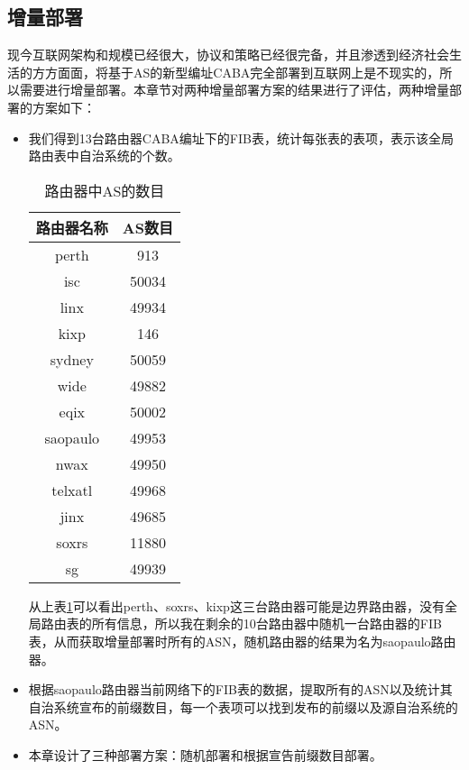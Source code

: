 \subsection{增量部署}
现今互联网架构和规模已经很大，协议和策略已经很完备，并且渗透到经济社会生活的方方面面，将基于AS的新型编址CABA完全部署到互联网上是不现实的，所以需要进行增量部署。本章节对两种增量部署方案的结果进行了评估，两种增量部署的方案如下：
\begin{itemize}
\item 我们得到13台路由器CABA编址下的FIB表，统计每张表的表项，表示该全局路由表中自治系统的个数。

    \begin{table}[h]
    \centering
    \caption{路由器中AS的数目}
    \label{tab:routeasnum}
        \begin{tabular}{|c|c|}
            \hline
            路由器名称 & AS数目 \\ \hline
            perth & 913 \\ \hline
            isc   & 50034 \\ \hline
            linx & 49934  \\ \hline
            kixp & 146 \\ \hline
            sydney& 50059  \\ \hline
            wide  & 49882  \\ \hline
            eqix  & 50002  \\ \hline
            saopaulo & 49953 \\ \hline
            nwax  & 49950   \\ \hline
            telxatl  & 49968 \\ \hline
            jinx  & 49685 \\ \hline
            soxrs  & 11880  \\ \hline
            sg    & 49939 \\  \hline
        \end{tabular}
    \end{table}

从上表\ref{tab:routeasnum}可以看出perth、soxrs、kixp这三台路由器可能是边界路由器，没有全局路由表的所有信息，所以我在剩余的10台路由器中随机一台路由器的FIB表，从而获取增量部署时所有的ASN，随机路由器的结果为名为saopaulo路由器。
\item 根据saopaulo路由器当前网络下的FIB表的数据，提取所有的ASN以及统计其自治系统宣布的前缀数目，每一个表项可以找到发布的前缀以及源自治系统的ASN。
\item 本章设计了三种部署方案：随机部署和根据宣告前缀数目部署。


\end{itemize}
